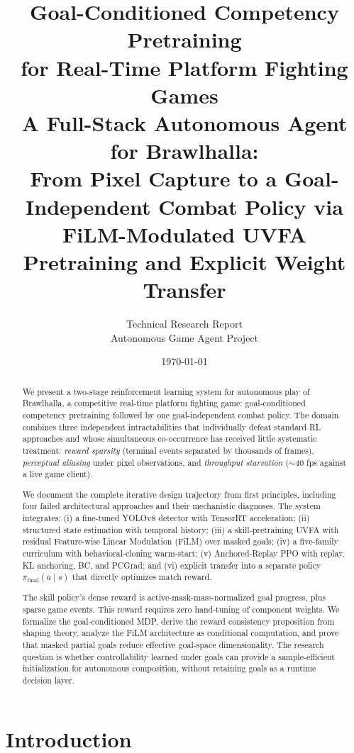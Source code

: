\documentclass[11pt,a4paper]{article}
\title{\textbf{Goal-Conditioned Competency Pretraining\\
for Real-Time Platform Fighting Games}\\[0.5em]
{\large A Full-Stack Autonomous Agent for Brawlhalla:\\
From Pixel Capture to a Goal-Independent Combat Policy via\\
FiLM-Modulated UVFA Pretraining and Explicit Weight Transfer}}
\author{
  Technical Research Report\\[0.3em]
  \small Autonomous Game Agent Project
}
\date{\today}
\begin{document}
\maketitle
\tableofcontents
\newpage

\begin{abstract}
We present a two-stage reinforcement learning system for autonomous play of Brawlhalla, a competitive real-time platform fighting game: goal-conditioned competency pretraining followed by one goal-independent combat policy.
The domain combines three independent intractabilities that individually defeat standard RL approaches and whose simultaneous co-occurrence has received little systematic treatment: \emph{reward sparsity} (terminal events separated by thousands of frames), \emph{perceptual aliasing} under pixel observations, and \emph{throughput starvation} (${\sim}40$ fps against a live game client).

We document the complete iterative design trajectory from first principles, including four failed architectural approaches and their mechanistic diagnoses.
The system integrates: (i) a fine-tuned YOLOv8 detector with TensorRT acceleration; (ii) structured state estimation with temporal history; (iii) a skill-pretraining UVFA with residual Feature-wise Linear Modulation (FiLM) over masked goals; (iv) a five-family curriculum with behavioral-cloning warm-start; (v) Anchored-Replay PPO with replay, KL anchoring, BC, and PCGrad; and (vi) explicit transfer into a separate policy $\pi_{\mathrm{final}}(a\mid s)$ that directly optimizes match reward.

The skill policy's dense reward is active-mask-mass-normalized goal progress, plus sparse game events.
This reward requires zero hand-tuning of component weights.
We formalize the goal-conditioned MDP, derive the reward consistency proposition from shaping theory, analyze the FiLM architecture as conditional computation, and prove that masked partial goals reduce effective goal-space dimensionality.
The research question is whether controllability learned under goals can provide a sample-efficient initialization for autonomous composition, without retaining goals as a runtime decision layer.
\end{abstract}

\newpage

\section{Introduction}
\label{sec:intro}
\end{document}

